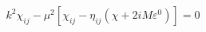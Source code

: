 \begin{equation}
k^2\chi_{ij} - \mu^2[\chi_{ij} - \eta_{ij}
(\chi + 2iM\varepsilon^0)] =0
\label{77}
\end{equation}

